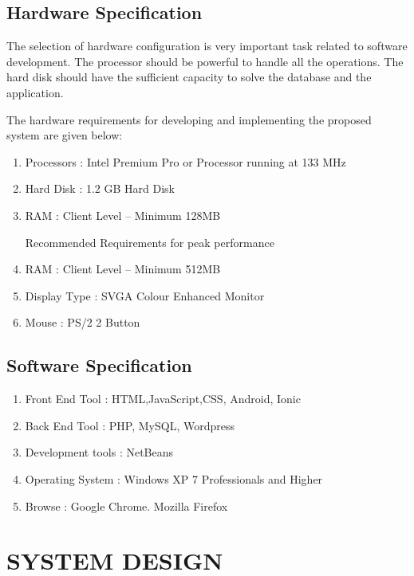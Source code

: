 \documentclass[a4paper,12pt]{article}
\begin{document}
\subsection{Hardware Specification}\vspace{2mm}
The selection of hardware configuration is very important task related to software development. The processor should be powerful to handle all the operations. The hard disk should have the sufficient capacity to solve the database and the application.\par\vspace{2mm}
The hardware requirements for developing and implementing the proposed system are given below:
\begin{enumerate}
\item Processors 	  : Intel Premium Pro or Processor running at 133 MHz
\item Hard Disk	  : 1.2 GB Hard Disk
\item RAM      	 :  Client Level – Minimum 128MB
    \par  Recommended Requirements for peak performance
\item RAM      	 :  Client Level – Minimum 512MB
\item Display Type	  : SVGA Colour Enhanced Monitor
\item Mouse           	  : PS/2 2 Button

\end{enumerate}\par\vspace{2mm}
\subsection{Software Specification}
\begin{enumerate}
         \item Front End Tool			: HTML,JavaScript,CSS, Android, Ionic
\item Back End Tool				: PHP, MySQL, Wordpress
       \item  Development tools		: NetBeans
       \item  Operating System		: Windows XP 7 Professionals and Higher
      \item   Browse                                   :  Google Chrome. Mozilla Firefox
\end{enumerate}

\newpage
\section{ SYSTEM DESIGN}\vspace{5mm}
\end{document}
